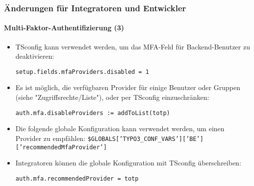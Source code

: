 %

\begin{frame}[fragile]
	\frametitle{Änderungen für Integratoren und Entwickler}
	\framesubtitle{Multi-Faktor-Authentifizierung (3)}


	\begin{itemize}
		\item TSconfig kann verwendet werden, um das MFA-Feld für Backend-Benutzer zu deaktivieren:
\begin{lstlisting}
setup.fields.mfaProviders.disabled = 1
\end{lstlisting}

		\item Es ist möglich, die verfügbaren Provider für einige Benutzer oder Gruppen
			(siehe "Zugriffsrechte/Liste"), oder per TSconfig einzuschränken:
\begin{lstlisting}
auth.mfa.disableProviders := addToList(totp)
\end{lstlisting}

		\item Die folgende globale Konfiguration kann verwendet werden, um einen Provider zu empfählen:\newline
			\smaller\texttt{\$GLOBALS['TYPO3\_CONF\_VARS']['BE']['recommendedMfaProvider']}\normalsize

		\item Integratoren können die globale Konfiguration mit TSconfig überschreiben:
\begin{lstlisting}
auth.mfa.recommendedProvider = totp
\end{lstlisting}

	\end{itemize}

\end{frame}

